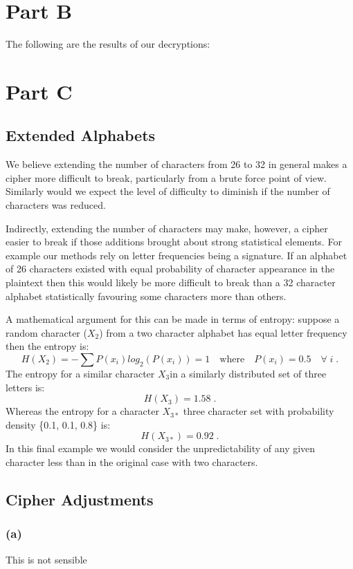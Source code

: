 \documentclass{book}%
\begin{document}


\section*{Part B}

The following are the results of our decryptions:

\section*{Part C}
\subsection*{Extended Alphabets}
We believe extending the number of characters from 26 to 32 in general makes a cipher more difficult to break, particularly from a brute force point of view. Similarly would we expect the level of difficulty to diminish if the number of characters was reduced.
\par Indirectly, extending the number of characters may make, however, a cipher easier to break if those additions brought about strong statistical elements. For example our methods rely on letter frequencies being a signature. If an alphabet of 26 characters existed with equal probability of character appearance in the plaintext then this would likely be more difficult to break than a 32 character alphabet statistically favouring some characters more than others.
\par A mathematical argument for this can be made in terms of entropy: suppose a random character (\(X_2\)) from a two character alphabet has equal letter frequency then the entropy is:
\[ H(X_2) = -\sum P(x_i)log_2(P(x_i)) = 1 \quad \text{where} \quad P(x_i)=0.5 \quad \forall \; i \;.\]
The entropy for a similar character \(X_3\)in a similarly distributed set of three letters is:
\[ H(X_3) = 1.58 \;.\]
Whereas the entropy for a character \(X_{3*}\) three character set with probability density \{0.1, 0.1, 0.8\} is:
\[ H(X_{3*}) = 0.92 \;. \]
In this final example we would consider the unpredictability of any given character less than in the original case with two characters.

\subsection*{Cipher Adjustments}
\subsubsection*{(a)}
This is not sensible
\end{document}
